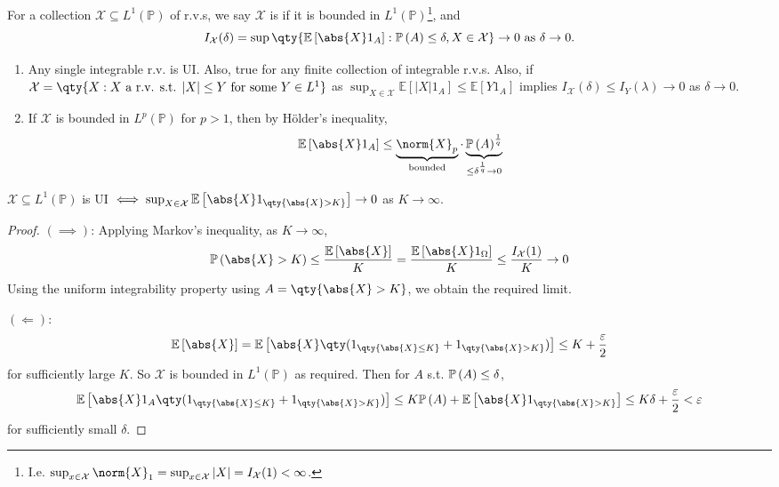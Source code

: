 \begin{definition}
	For a collection $\mathcal X \subseteq L^1(\mathbb P)$ of r.v.s, we say $\mathcal X$ is  if it is bounded in $L^1(\mathbb P)$\footnote{I.e. $\sup_{x \in \mathcal{X}} \norm{X}_1 = \sup_{x \in \mathcal{X}} |X| = I_{\mathcal{X}}(1) < \infty$.}, and
	\[ I_{\mathcal X}(\delta) = \sup \qty{ \expect{\abs{X}1_A} : \prob{A} \leq \delta, X \in \mathcal X} \to 0 \text{ as } \delta \to 0.\]
\end{definition}

\begin{remark}
	\begin{enumerate}
		\item Any single integrable r.v. is UI.
		Also, true for any finite collection of integrable r.v.s.
		Also, if $\mathcal{X} = \qty{X : X \text{ a r.v. s.t. } |X| \leq Y \text{ for some } Y \in L^1}$ as $\sup_{X \in \mathcal{X}} \mathbb{E}[|X| 1_A] \leq \mathbb{E}[Y 1_A]$ implies $I_{\mathcal{X}}(\delta) \leq I_Y(\lambda) \to 0$ as $\delta \to 0$.
		\item If $\mathcal X$ is bounded in $L^p(\mathbb P)$ for $p > 1$, then by H\"older's inequality,
		\[ \expect{\abs{X}1_A} \leq \underbrace{\norm{X}_p}_{\text{bounded}} \cdot \underbrace{\prob{A}^{\frac 1 q}}_{\leq \delta^{\frac 1 q} \to 0} \]
	\end{enumerate}
\end{remark}


\begin{lemma}
	$\mathcal X \subseteq L^1(\mathbb P)$ is UI $\iff \sup_{X \in \mathcal X} \expect{\abs{X} 1_{\qty{\abs{X} > K}}} \to 0$ as $K \to \infty$.
\end{lemma}

\begin{proof}
	$(\implies)$: Applying Markov's inequality, as $K \to \infty$,
	\[ \prob{\abs{X} > K} \leq \frac{\expect{\abs{X}}}{K} = \frac{\expect{\abs{X}1_{\Omega}}}{K} \leq \frac{I_{\mathcal X}(1)}{K} \to 0 \]
	Using the uniform integrability property using $A = \qty{\abs{X} > K}$, we obtain the required limit.

	$(\Longleftarrow)$:
	\[ \expect{\abs{X}} = \expect{\abs{X}\qty(1_{\qty{\abs{X} \leq K}} + 1_{\qty{\abs{X} > K}})} \leq K + \frac{\varepsilon}{2} \]
	for sufficiently large $K$.
	So $\mathcal X$ is bounded in $L^1(\mathbb P)$ as required.
	Then for $A$ s.t. $\mathbb{P}\left({A}\right) \leq \delta$,
	\[ \expect{\abs{X}1_A\qty(1_{\qty{\abs{X} \leq K}} + 1_{\qty{\abs{X} > K}})} \leq K\prob{A} + \expect{\abs{X}1_{\qty{\abs{X} > K}}} \leq K\delta + \frac{\varepsilon}{2} < \varepsilon \]
	for sufficiently small $\delta$.
\end{proof}

